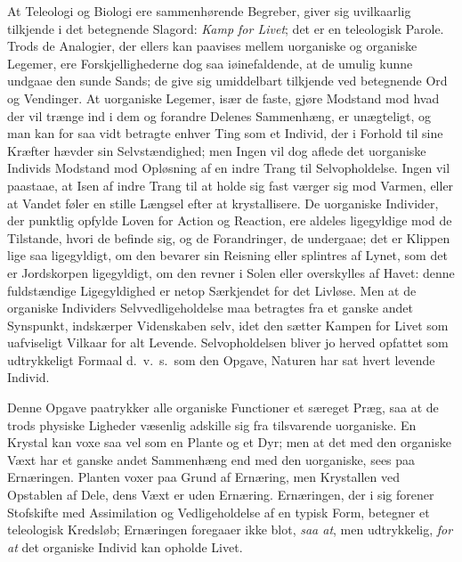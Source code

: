 \documentclass[12pt]{book}
\newcommand{\apage}[1]{\marginnote{\footnotesize\textit{[#1]}}}
\begin{document}
\apage{175} At Teleologi og Biologi ere sammenhørende Begreber, giver sig uvilkaarlig
tilkjende i det betegnende Slagord: \emph{Kamp for Livet}; det er en teleologisk
Parole. Trods de Analogier, der ellers kan paavises mellem uorganiske og
organiske Legemer, ere Forskjellighederne dog saa iøinefaldende, at de
umulig kunne undgaae den sunde Sands; de give sig umiddelbart tilkjende ved
betegnende Ord og Vendinger. At uorganiske Legemer, især de faste, gjøre
Modstand mod hvad der vil trænge ind i dem og forandre Delenes Sammenhæng,
er unægteligt, og man kan for saa vidt betragte enhver Ting som et Individ,
der i Forhold til sine Kræfter hævder sin Selvstændighed; men Ingen vil dog
aflede det uorganiske Individs Modstand mod Opløsning af en indre Trang til
Selvopholdelse. Ingen vil paastaae, at Isen af indre Trang til at holde sig
fast værger sig mod Varmen, eller at Vandet føler en stille Længsel efter
at krystallisere. De uorganiske Individer, der punktlig opfylde Loven for
Action og Reaction, ere aldeles ligegyldige mod de Tilstande, hvori de
befinde sig, og de Forandringer, de undergaae; det er Klippen lige saa
ligegyldigt, om den bevarer sin Reisning eller splintres af Lynet, som det
er Jordskorpen ligegyldigt, om den revner i Solen eller overskylles af
Havet: denne fuldstændige Ligegyldighed er netop Særkjendet for det
Livløse. Men at de organiske Individers Selvvedligeholdelse maa betragtes
fra et ganske andet Synspunkt, indskærper Videnskaben selv, idet den sætter
Kampen for Livet som uafviseligt Vilkaar for alt Levende. Selvopholdelsen \apage{176} 
bliver jo herved opfattet som udtrykkeligt Formaal d.\ v.\ s.\ som den Opgave,
Naturen har sat hvert levende Individ.

Denne Opgave paatrykker alle organiske Functioner et særeget Præg, saa at
de trods physiske Ligheder væsenlig adskille sig fra tilsvarende
uorganiske. En Krystal kan voxe saa vel som en Plante og et Dyr; men at det
med den organiske Væxt har et ganske andet Sammenhæng end med den
uorganiske, sees paa Ernæringen. Planten voxer paa Grund af Ernæring, men
Krystallen ved Opstablen af Dele, dens Væxt er uden Ernæring. Ernæringen,
der i sig forener Stofskifte med Assimilation og Vedligeholdelse af en
typisk Form, betegner et teleologisk Kredsløb; Ernæringen foregaaer ikke
blot, \emph{saa at}, men udtrykkelig, \emph{for at} det organiske Individ kan opholde
Livet.
\end{document}
